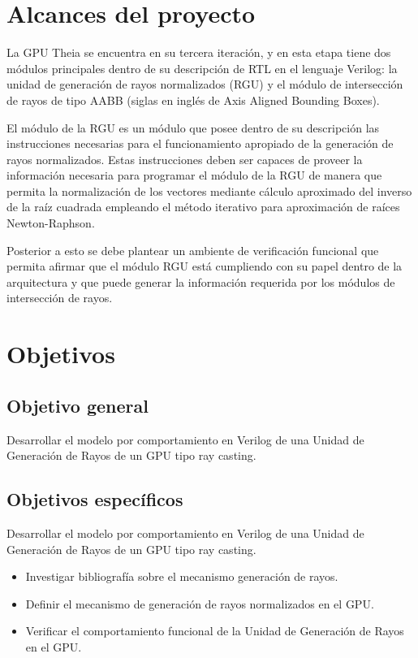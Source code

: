\section{Alcances del proyecto}

La GPU Theia se encuentra en su tercera iteración, y en esta etapa tiene dos módulos principales dentro de su descripción de RTL en el lenguaje Verilog: la unidad de generación de rayos normalizados (RGU) y el módulo de intersección de rayos de tipo AABB (siglas en inglés de Axis Aligned Bounding Boxes).

El módulo de la RGU es un módulo que posee dentro de su descripción las instrucciones necesarias para el funcionamiento apropiado de la generación de rayos normalizados. Estas instrucciones deben ser capaces de proveer la información necesaria para programar el módulo de la RGU de manera que permita la normalización de los vectores mediante cálculo aproximado del inverso de la raíz cuadrada empleando el método iterativo para aproximación de raíces Newton-Raphson.

Posterior a esto se debe plantear un ambiente de verificación funcional que permita afirmar que el módulo RGU está cumpliendo con su papel dentro de la arquitectura y que puede generar la información requerida por los módulos de intersección de rayos.

\section{Objetivos}

\subsection{Objetivo general}
 Desarrollar el modelo por comportamiento en Verilog de una Unidad de Generación de Rayos de un GPU tipo ray casting.


\subsection{Objetivos específicos}
 Desarrollar el modelo por comportamiento en Verilog de una Unidad de Generación de Rayos de un GPU tipo ray casting.

\begin{itemize} %
	\item Investigar bibliografía sobre el mecanismo generación de rayos.
	\item Definir el mecanismo de generación de rayos normalizados en el GPU.
	\item Verificar el comportamiento funcional de la Unidad de Generación de Rayos en el GPU.
\end{itemize}
 
